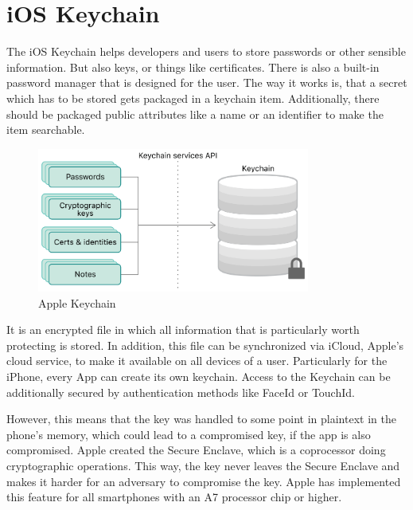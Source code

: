 \documentclass[12pt,oneside,a4paper,parskip]{scrbook}
\begin{document}

\section{iOS Keychain}

The iOS Keychain helps developers and users to store passwords or other sensible information. But also keys, or things like certificates. There is also a built-in password manager that is designed for the user. The way it works is, that a secret which has to be stored gets packaged in a keychain item. Additionally, there should be packaged public attributes like a name or an identifier to make the item searchable. 

\begin{figure}[ht]
  \centering
  \includegraphics[width=0.8\textwidth]{ressources/apple_keychain.png}
  \caption{Apple Keychain \parencite{apple_keychain_2020}}
  \label{apple:keychain}
\end{figure}

It is an encrypted file in which all information that is particularly worth protecting is stored. In addition, this file can be synchronized via iCloud, Apple's cloud service, to make it available on all devices of a user. Particularly for the iPhone, every App can create its own keychain. Access to the Keychain can be additionally secured by authentication methods like FaceId or TouchId.

However, this means that the key was handled to some point in plaintext in the phone's memory, which could lead to a compromised key, if the app is also compromised. Apple created the Secure Enclave, which is a coprocessor doing cryptographic operations. This way, the key never leaves the Secure Enclave and makes it harder for an adversary to compromise the key.
Apple has implemented this feature for all smartphones with an A7 processor chip or higher.
\parencite{apple_keychain_2020}
\end{document}
